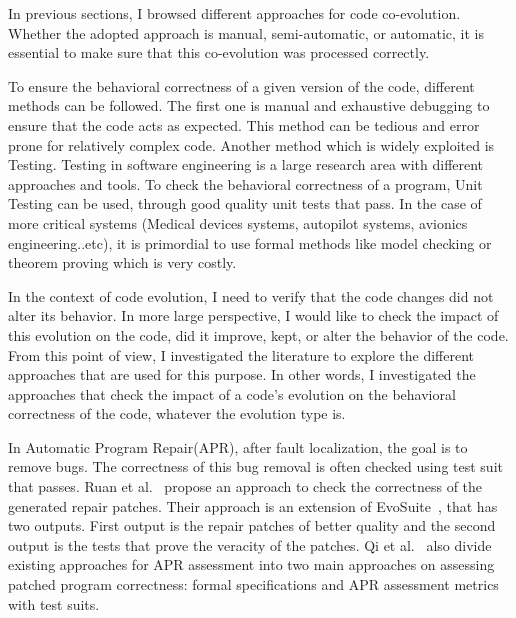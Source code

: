 In previous sections, I browsed different approaches for code co-evolution. Whether the adopted approach is manual, semi-automatic, or automatic, it is essential to make sure that this co-evolution was processed correctly. 

 To ensure the behavioral correctness of a given version of the code, different methods can be followed. The first one is manual and exhaustive debugging to ensure that the code acts as expected. This method can be tedious and error prone for relatively complex code. Another method which is widely exploited is Testing. Testing in software engineering is a large research area with different approaches and tools. To check the behavioral correctness of a program, Unit Testing can be used, through good quality unit tests that pass. In the case of more critical systems (Medical devices systems, autopilot systems, avionics engineering..etc), it is primordial to use formal methods like model checking or theorem proving \cite{ZHANG201312} which is very costly.
 
 In the context of code evolution, I need to verify that the code changes did not alter its behavior. 
 In more large perspective, I would like to check the impact of this evolution on the code, did it improve, kept, or alter the behavior of the code. From this point of view, I investigated the literature to explore the different approaches that are used for this purpose. In other words, I investigated the approaches that check the impact of a code's evolution on the behavioral correctness of the code, whatever the evolution type is.
 
In Automatic Program Repair(APR), after fault localization, the goal is to remove bugs. The correctness of this bug removal is often checked using test suit that passes.
Ruan et al.~\cite{10638555} propose an approach to check the correctness of the generated repair patches. Their approach is an extension of EvoSuite~\cite{fraser2011evosuite}, that has two outputs. First output is the repair patches of better quality and the second output is the tests that prove the veracity of the patches. Qi et al.~\cite{8612557} also divide existing approaches for APR assessment into two main approaches on assessing patched program correctness: formal specifications and APR assessment metrics with test suits.

